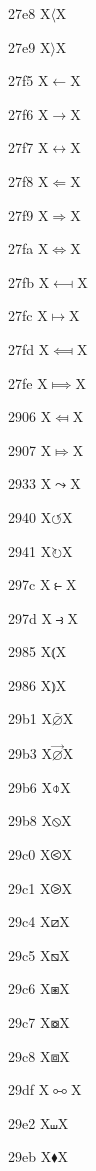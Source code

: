\documentclass[11pt]{article}
\begin{document}
27e8 X{\ensuremath{\langle}}X

27e9 X{\ensuremath{\rangle}}X

27f5 X{\ensuremath{\longleftarrow}}X

27f6 X{\ensuremath{\longrightarrow}}X

27f7 X{\ensuremath{\longleftrightarrow}}X

27f8 X{\ensuremath{\Longleftarrow}}X

27f9 X{\ensuremath{\Longrightarrow}}X

27fa X{\ensuremath{\Longleftrightarrow}}X

27fb X{\ensuremath{\longmapsfrom}}X

27fc X{\ensuremath{\longmapsto}}X

27fd X{\ensuremath{\Longmapsfrom}}X

27fe X{\ensuremath{\Longmapsto}}X

2906 X{\ensuremath{\Mapsfrom}}X

2907 X{\ensuremath{\Mapsto}}X

2933 X{\ensuremath{\leadsto}}X

2940 X{\ensuremath{\circlearrowleft}}X

2941 X{\ensuremath{\circlearrowright}}X

297c X{\ensuremath{\strictfi}}X

297d X{\ensuremath{\strictif}}X

2985 X{\ensuremath{\Lparen}}X

2986 X{\ensuremath{\Rparen}}X

29b1 X{\ensuremath{\bar{\varnothing}}}X

29b3 X{\ensuremath{\vec{\varnothing}}}X

29b6 X{\ensuremath{\obar}}X

29b8 X{\ensuremath{\obslash}}X

29c0 X{\ensuremath{\olessthan}}X

29c1 X{\ensuremath{\ogreaterthan}}X

29c4 X{\ensuremath{\boxslash}}X

29c5 X{\ensuremath{\boxbslash}}X

29c6 X{\ensuremath{\boxast}}X

29c7 X{\ensuremath{\boxcircle}}X

29c8 X{\ensuremath{\boxbox}}X

29df X{\ensuremath{\multimapboth}}X

29e2 X{\ensuremath{\shuffle}}X

29eb X{\ensuremath{\blacklozenge}}X
\end{document}
